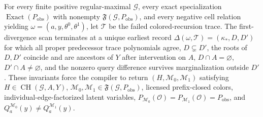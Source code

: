 For every finite positive regular-maximal \(\mathcal G\), every exact specialization \(\operatorname{Exact}(P_{\mathrm{obs}})\) with nonempty \(\mathfrak F(\mathcal G,P_{\mathrm{obs}})\), and every negative cell relation yielding \(\omega=(a,y,\theta^0,\theta^1)\), let \(\mathcal T\) be the failed colored-recursion trace. The first-divergence scan terminates at a unique earliest record \(\Delta(\omega,\mathcal T)=(\kappa_*,D,D')\) for which all proper predecessor trace polynomials agree, \(D\subsetneq D'\), the roots of \(D,D'\) coincide and are ancestors of \(Y\) after intervention on \(A\), \(D\cap A=\varnothing\), \(D'\cap A\neq\varnothing\), and the nonzero query difference survives marginalization outside \(D'\). These invariants force the compiler to return \((H,\mathcal M_0,\mathcal M_1)\) satisfying \(H\in\operatorname{CH}(\mathcal G,A,Y)\), \(\mathcal M_0,\mathcal M_1\in\mathfrak F(\mathcal G,P_{\mathrm{obs}})\), licensed prefix-closed colors, individual-edge-factorized latent variables, \(P_{\mathcal M_0}(\mathcal O)=P_{\mathcal M_1}(\mathcal O)=P_{\mathrm{obs}}\), and \(Q_a^{\mathcal M_0}(y)\neq Q_a^{\mathcal M_1}(y)\).